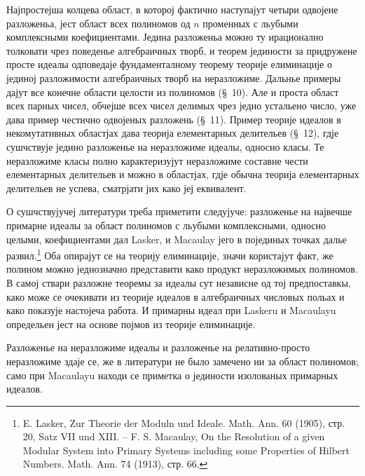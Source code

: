 ﻿\documentclass[11pt]{article}
\begin{document}
Најпростејша колцева област, в которој фактично наступајут четыри одвојене разложеньа, јест област всех полиномов од \(n\) променных с льубыми комплексными коефициентами. Једина разложеньа можно ту ирационално толковати чрез поведенье алгебраичных творб, и теорем јединости за придружене просте идеалы одповедаје фундаменталному теорему теорије елиминације о јединој разложимости алгебраичных творб на неразложиме. Дальнье примеры дајут все конечне области целости из полиномов (\S~10). Але и проста област всех парных чисел, обчејше всех чисел делимых чрез једно устальено число, уже дава пример честично одвојеных разложень (\S~11). Пример теорије идеалов в некомутативных областјах дава теорија елементарных делительев (\S~12), гдје сушчствује једино разложенье на неразложиме идеалы, односно класы. Те неразложиме класы полно карактеризујут неразложиме составне чести елементарных делительев и можно в областјах, гдје обычна теорија елементарных делительев не успева, сматрјати јих како јеј еквивалент.

О сушчствујучеј литератури треба приметити следујуче: разложенье на највечше примарне идеалы за област полиномов с льубыми комплексными, односно целыми, коефициентами дал Lasker, и Macaulay јего в појединых точках далье развил.\footnote{E. Lasker, Zur Theorie der Moduln und Ideale. Math. Ann. 60 (1905), стр. 20, Satz VII und XIII. -- F. S. Macaulay, On the Resolution of a given Modular System into Primary Systems including some Properties of Hilbert Numbers. Math. Ann. 74 (1913), стр. 66.} Оба опирајут се на теорију елиминације, значи користајут факт, же полином можно једнозначно представити како продукт неразложимых полиномов. В самој ствари разложне теоремы за идеалы сут независне од тој предпоставкы, како може се очекивати из теорије идеалов в алгебраичных числовых польах и како показује настојеча работа. И примарны идеал при Laskeru и Macaulayu определьен јест на основе појмов из теорије елиминације.

Разложенье на неразложиме идеалы и разложенье на релативно-просто неразложиме здаје се, же в литератури не было замечено ни за област полиномов; само при Macaulayu находи се приметка о јединости изолованых примарных идеалов.
\end{document}
